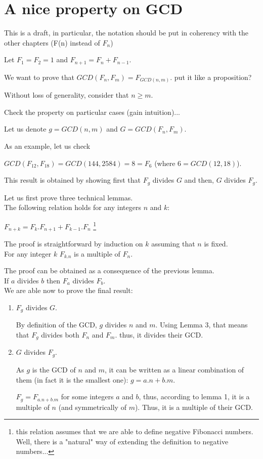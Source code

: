 
\chapter{A nice property on GCD}
\label{Appendix:FiboGCD}

This is a draft, in particular, the notation should be put in coherency with the other chapters
(F(n) instead of $F_n$)
\bigskip

Let $F_1=F_2=1$ and $F_{n+1}=F_n+F_{n-1}$.
\medskip

\noindent We want to prove that $GCD(F_n,F_m) = F_{GCD(n,m)}$.
{\Denis put it like a proposition?}

Without loss of generality, consider that $n \geq m$.

Check the property on particular cases (gain intuition)...

Let us denote $g=GCD(n,m)$ and $G=GCD(F_n,F_m)$.

As an example, let us check 

$GCD(F_{12},F_{18}) = GCD(144,2584) = 8 = F_6$ (where $6=GCD(12,18)$).
\medskip

This result is obtained by showing first that $F_g$ divides $G$ and then, $G$ divides $F_g$.

Let us first prove three technical lemmas.
\\

The following relation holds for any integers $n$ and $k$:

$F_{n+k} = F_k.F_{n+1} + F_{k-1}.F_n$ \footnote{this relation assumes that we are able to define negative Fibonacci numbers. 
Well, there is a "natural" way of extending
the definition to negative numbers...}

The proof is straightforward  by induction on $k$ assuming that $n$ is fixed.
\\

For any integer $k$ $F_{k.n}$ is a multiple of $F_n$.

The proof can be obtained as a consequence of the previous lemma.
\\

If $a$ divides $b$ then $F_a$ divides $F_b$.
\\

We are able now to prove the final result:
\begin{enumerate}
\item $F_g$ divides $G$.

By definition of the GCD, $g$ divides $n$ and $m$. 
Using Lemma 3, that means that $F_g$ divides both $F_n$ and $F_m$.
thus, it divides their GCD.
\item $G$ divides $F_g$.

As $g$ is the GCD of $n$ and $m$, it can be written as a linear combination of them (in fact it is the smallest one):
$g = a.n + b.m$.

$F_g = F_{a.n + b.m}$ for some integers $a$ and $b$,
thus, according to lemma 1, it is a multiple of $n$ (and symmetrically of $m$).
Thus, it is a multiple of their GCD. 
\end{enumerate}


